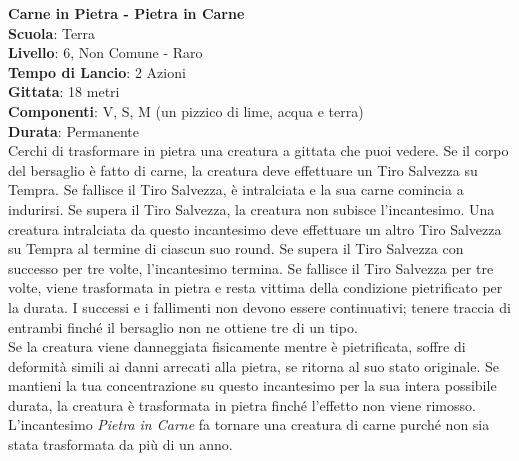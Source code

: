 \begin{multicols}{2}
\medskip\textbf{Carne in Pietra - Pietra in Carne}\\
\textbf{Scuola}: Terra\\
\textbf{Livello}: 6, Non Comune - Raro\\
\textbf{Tempo di Lancio}: 2 Azioni\\
\textbf{Gittata}: 18 metri\\
\textbf{Componenti}: V, S, M (un pizzico di lime, acqua e terra)\\
\textbf{Durata}: Permanente\\
Cerchi di trasformare in pietra una creatura a gittata che puoi vedere. Se il corpo del bersaglio è fatto di carne, la creatura deve effettuare un Tiro Salvezza su Tempra. Se fallisce il Tiro Salvezza, è intralciata e la sua carne comincia a indurirsi. Se supera il Tiro Salvezza, la creatura non subisce l'incantesimo. Una creatura intralciata da questo incantesimo deve effettuare un altro Tiro Salvezza su Tempra al termine di ciascun suo round. Se supera il Tiro Salvezza con successo per tre volte, l'incantesimo termina. Se fallisce il Tiro Salvezza per tre volte, viene trasformata in pietra e resta vittima della condizione pietrificato per la durata. I successi e i fallimenti non devono essere continuativi; tenere traccia di entrambi finché il bersaglio non ne ottiene tre di un tipo.\\
Se la creatura viene danneggiata fisicamente mentre è pietrificata, soffre di deformità simili ai danni arrecati alla pietra, se ritorna al suo stato originale. Se mantieni la tua concentrazione su questo incantesimo per la sua intera possibile durata, la creatura è trasformata in pietra finché l'effetto non viene rimosso.\\
L'incantesimo \textit{Pietra in Carne} fa tornare una creatura di carne purché non sia stata trasformata da più di un anno.


\end{multicols}

